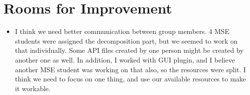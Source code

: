 \documentclass{article}
\begin{document}
\section*{Rooms for Improvement}

\begin{itemize}
   \item I think we need better communication between group members. 4 MSE students were assigned the decomposition part, but we seemed to work on that individually. Some API files created by one person might be created by another one as well. In addition, I worked with GUI plugin, and I believe another MSE student was working on that also, so the resources were split. I think we need to focus on one thing, and use our available resources to make it workable. 
\end{itemize}
\end{document}
